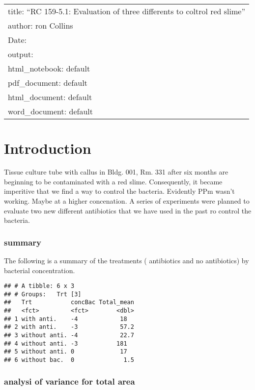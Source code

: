 \documentclass[
]{article}
\author{}
\date{\vspace{-2.5em}}
\begin{document}
\begin{longtable}[]{@{}l@{}}
\toprule
\endhead
title: ``RC 159-5.1: Evaluation of three differents to coltrol red
slime''\tabularnewline
author: ron Collins\tabularnewline
Date:\tabularnewline
output:\tabularnewline
html\_notebook: default\tabularnewline
pdf\_document: default\tabularnewline
html\_document: default\tabularnewline
word\_document: default\tabularnewline
\bottomrule
\end{longtable}

\hypertarget{introduction}{%
\section{Introduction}\label{introduction}}

Tissue culture tube with callus in Bldg. 001, Rm. 331 after six months
are beginning to be contaminated with a red slime. Consequently, it
became imperitive that we find a way to control the bacteria. Evidently
PPm wasn't working. Maybe at a higher concenation. A series of
experiments were planned to evaluate two new different antibiotics that
we have used in the past ro control the bacteria.

\hypertarget{summary}{%
\subsubsection{summary}\label{summary}}

The following is a summary of the treatments ( antibiotics and no
antibiotics) by bacterial concentration.

\begin{verbatim}
## # A tibble: 6 x 3
## # Groups:   Trt [3]
##   Trt           concBac Total_mean
##   <fct>         <fct>        <dbl>
## 1 with anti.    -4            18  
## 2 with anti.    -3            57.2
## 3 without anti. -4            22.7
## 4 without anti. -3           181  
## 5 without anti. 0             17  
## 6 without bac.  0              1.5
\end{verbatim}

\hypertarget{analysi-of-variance-for-total-area}{%
\subsubsection{analysi of variance for total
area}\label{analysi-of-variance-for-total-area}}
\end{document}
